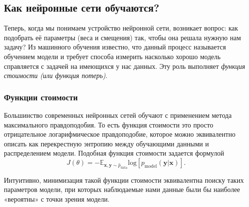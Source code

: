 



\subsection{Как нейронные сети обучаются?}

Теперь, когда мы понимаем устройство нейронной сети, возникает вопрос: 
как подобрать её параметры (веса и смещения) так, чтобы она решала нужную нам задачу? 
Из машинного обучения известно, что данный процесс называется обучением модели и требует 
способа измерить насколько хорошо модель справляется с задачей на имеющихся у нас данных. 
Эту роль выполняет \textit{функция стоимости (или функция потерь)}.

\subsubsection{Функции стоимости}

Большинство современных нейронных сетей обучают с применением метода максимального 
правдоподобия. То есть функция стоимости это просто отрицательное логарифмическое 
правдоподобие, которое можно эквивалентно описать как перекрестную энтропию 
между обучающими данными и распределением модели. Подобная функция стоимости 
задается формулой 
\begin{equation*}
    J(\theta) = - \mathbb{E}_{\bm{x},\bm{y} \sim \hat{p}_{\text{data}}} \text{log} \left[ p_\text{model} (\bm{y} | \bm{x}) \right].
\end{equation*}

Интуитивно, минимизация такой функции стоимости эквивалентна поиску таких параметров 
модели, при которых наблюдаемые нами данные были бы наиболее «вероятны» с точки 
зрения модели.

